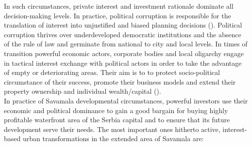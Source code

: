 \documentclass[11pt]{report}
\begin{document}
In such circumstances, private interest and investment rationale dominate all decision-making levels. In practice, political corruption is responsible for the translation of interest into unjustified and biased planning decisions 
(\cite{adjustment of planning practice nedovic budic 2001}).
Political corruption thrives over underdeveloped democratic institutions and the absence of the rule of  law  and germinate from national to city and local levels.
In times of transition powerful economic actors, corporate bodies and local oligarchy engage in tactical interest exchange with political actors in order to take the advantage of empty or deteriorating areas. Their aim is to to protect socio-political circumstance of their success, promote their business models and extend their property ownership and individual  wealth/capital (\cite{Lazarevic Bajec 2009}).
\\
In practice of Savamala developmental circumstances, powerful investors use their economic and political dominance to gain a good bargain for buying highly profitable waterfront area of the Serbia capital and to ensure that its future development serve their needs. The most important ones hitherto active, interest-based urban transformations in the extended area of Savamala are:
\end{document}
